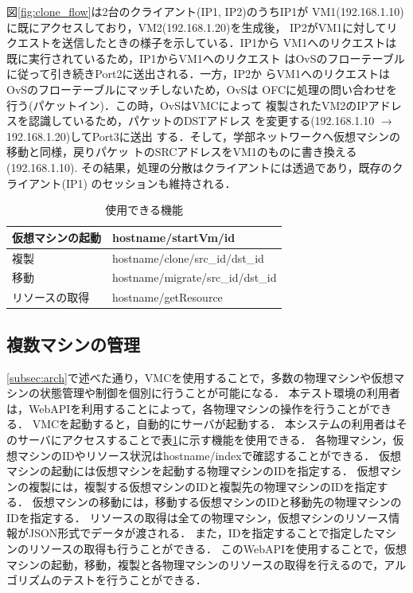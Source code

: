 \documentclass[submit,techrep]{ipsj}
\begin{document}
\begin{enumerate}
   図\ref{fig:clone_flow}は2台のクライアント(IP1, IP2)のうちIP1が
   VM1(192.168.1.10)に既にアクセスしており，VM2(192.168.1.20)を生成後，
   IP2がVM1に対してリクエストを送信したときの様子を示している．IP1から
   VM1へのリクエストは既に実行されているため，IP1からVM1へのリクエスト
   はOvSのフローテーブルに従って引き続きPort2に送出される．一方，IP2か
   らVM1へのリクエストはOvSのフローテーブルにマッチしないため，OvSは
   OFCに処理の問い合わせを行う(パケットイン)．この時，OvSはVMCによって
   複製されたVM2のIPアドレスを認識しているため，パケットのDSTアドレス
   を変更する(192.168.1.10 $\rightarrow$ 192.168.1.20)してPort3に送出
   する．そして，学部ネットワークへ仮想マシンの移動と同様，戻りパケッ
   トのSRCアドレスをVM1のものに書き換える(192.168.1.10).
   その結果，処理の分散はクライアントには透過であり，既存のクライアント(IP1)
   のセッションも維持される．

\end{enumerate}

\begin{table}[tb]
	\centering
	\caption{使用できる機能}
	\label{tab:vmc_func}
	{
		\small
		\begin{tabular}{|l|l|} \hline
		仮想マシンの起動 & hostname/startVm/id\\ \hline
		複製 & hostname/clone/src\_id/dst\_id\\ \hline
		移動 & hostname/migrate/src\_id/dst\_id\\ \hline
		リソースの取得 & hostname/getResource\\ \hline
		\end{tabular}
	}
\end{table}

\subsection{複数マシンの管理}
\ref{subsec:arch}で述べた通り，VMCを使用することで，多数の物理マシンや仮想マシンの状態管理や制御を個別に行うことが可能になる．
本テスト環境の利用者は，WebAPIを利用することによって，各物理マシンの操作を行うことができる．
VMCを起動すると，自動的にサーバが起動する．
本システムの利用者はそのサーバにアクセスすることで表\ref{tab:vmc_func}に示す機能を使用できる．
各物理マシン，仮想マシンのIDやリソース状況はhostname/indexで確認することができる．
仮想マシンの起動には仮想マシンを起動する物理マシンのIDを指定する．
仮想マシンの複製には，複製する仮想マシンのIDと複製先の物理マシンのIDを指定する．
仮想マシンの移動には，移動する仮想マシンのIDと移動先の物理マシンのIDを指定する．
リソースの取得は全ての物理マシン，仮想マシンのリソース情報がJSON形式でデータが渡される．
また，IDを指定することで指定したマシンのリソースの取得も行うことができる．
このWebAPIを使用することで，仮想マシンの起動，移動，複製と各物理マシンのリソースの取得を行えるので，アルゴリズムのテストを行うことができる．
\end{document}
